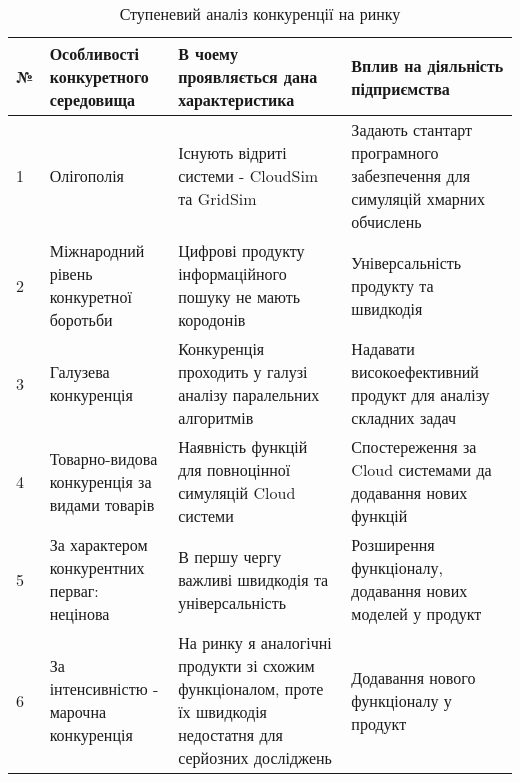 \begin{table}[H]
	\begin{tabular}
		{|l|p{4cm}|p{4cm}|p{4cm}|} \hline
		№
		& Особливості конкуретного середовища
		& В чоему проявляється дана характеристика
		& Вплив на діяльність підприємства
		\\ \hline
		
		1
		& Олігополія
		& Існують відриті системи - CloudSim та GridSim
		& Задають стантарт програмного забезпечення для симуляцій хмарних обчислень
		\\ \hline
		
		2
		& Міжнародний рівень конкуретної боротьби
		& Цифрові продукту інформаційного пошуку не мають кородонів
		& Універсальність продукту та швидкодія
		\\ \hline
		
		3
		& Галузева конкуренція
		& Конкуренція проходить у галузі аналізу паралельних алгоритмів
		& Надавати високоефективний продукт для аналізу складних задач
		\\ \hline
		
		4
		& Товарно-видова конкуренція за видами товарів
		& Наявність функцій для повноцінної симуляцій Cloud системи
		& Спостереження за Cloud системами да додавання нових функцій
		\\ \hline
		
		5
		& За характером конкурентних перваг: нецінова
		& В першу чергу важливі швидкодія та універсальність
		& Розширення функціоналу, додавання нових моделей у продукт
		\\ \hline
		
		6
		& За інтенсивністю - марочна конкуренція
		& На ринку я аналогічні продукти зі схожим функціоналом, проте їх швидкодія недостатня для серйозних досліджень
		& Додавання нового функціоналу у продукт
		\\ \hline
		
	\end{tabular}
	\caption{Ступеневий аналіз конкуренції на ринку}
\end{table}

